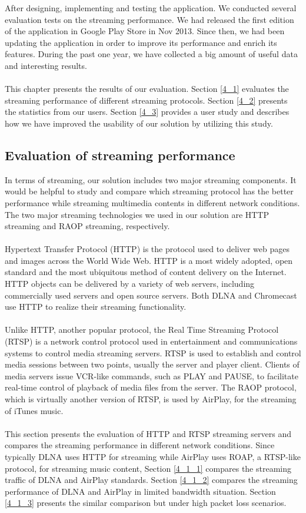 
After designing, implementing and testing the application. We conducted several
evaluation tests on the streaming performance. We had released the first
edition of the application in Google Play Store in Nov 2013. Since then, we had
been updating the application in order to improve its performance and enrich
its features. During the past one year, we have collected a big amount of
useful data and interesting results. \\
\\
This chapter presents the results of our evaluation. Section \ref{4_1} evaluates
the streaming performance of different streaming protocols. Section \ref{4_2}
presents the statistics from our users. Section \ref{4_3} provides a user study
and describes how we have improved the usability of our solution by utilizing
this study.
\subsection{Evaluation of streaming performance\label{4_1}}
In terms of streaming, our solution includes two major streaming components. It
would be helpful to study and compare which streaming protocol has the better
performance while streaming multimedia contents in different network conditions.
The two major streaming technologies we used in our solution are HTTP streaming
and RAOP streaming, respectively.\\
\\
Hypertext Transfer Protocol (HTTP) is the protocol used to deliver web pages
and images across the World Wide Web. HTTP is a most widely adopted, open
standard and the most ubiquitous method of content delivery on the Internet.
HTTP objects can be delivered by a variety of web servers, including
commercially used servers and open source servers. Both DLNA and Chromecast use
HTTP to realize their streaming functionality.\\
\\
Unlike HTTP, another popular protocol, the Real Time Streaming Protocol (RTSP)
is a network control protocol used in entertainment and communications systems
to control media streaming servers. RTSP is used to establish and control media
sessions between two points, usually the server and player client. Clients of
media servers issue VCR-like commands, such as PLAY and PAUSE, to facilitate
real-time control of playback of media files from the server.  The RAOP
protocol, which is virtually another version of RTSP, is used by AirPlay, for
the streaming of iTunes music.\\
\\
This section presents the evaluation of HTTP and RTSP streaming servers and
compares the streaming performance in different network conditions. Since
typically DLNA uses HTTP for streaming while AirPlay uses ROAP, a
RTSP-like protocol, for streaming music content, Section \ref{4_1_1} compares
the streaming traffic of DLNA and AirPlay standards. Section \ref{4_1_2} compares
the streaming performance of DLNA and AirPlay in limited bandwidth situation.
Section \ref{4_1_3} presents the similar comparison but under high packet loss
scenarios.
